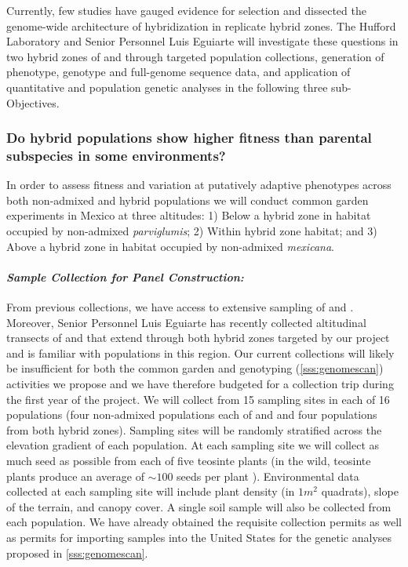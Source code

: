 Currently, few studies have gauged evidence for selection and dissected the genome-wide architecture of hybridization in replicate hybrid zones.
The Hufford Laboratory and Senior Personnel Luis Eguiarte  will investigate these questions in two hybrid zones of \zm{} and \zp{} through targeted population collections, generation of phenotype, genotype and full-genome sequence data, and application of quantitative and population genetic analyses in the following three sub-Objectives.

\subsubsection{Do hybrid populations show higher fitness than parental subspecies in some environments?} 
\label{sss:fitness}

In order to assess fitness and variation at putatively adaptive phenotypes across both non-admixed and  hybrid populations we will conduct common garden experiments in Mexico at three altitudes: 1) Below a hybrid zone in habitat occupied by non-admixed \emph{parviglumis}; 2) Within hybrid zone habitat; and 3) Above a hybrid zone in habitat occupied by non-admixed \emph{mexicana}. 

\paragraph{\emph{Sample Collection for Panel Construction:}}
From previous collections, we have access to extensive sampling of \zm{} and \zp{}.
Moreover, Senior Personnel Luis Eguiarte has recently collected altitudinal transects of \zp{} and \zm{} that extend through both hybrid zones targeted by our project \citep{Diez2013} and is familiar with populations in this region.
Our current collections will likely be insufficient for both the common garden and genotyping (\ref{sss:genomescan}) activities we propose and we have therefore budgeted for a collection trip during the first year of the project.
We will collect from 15 sampling sites in each of 16 populations (four non-admixed populations each of \zp{} and \zm{} and four populations from both hybrid zones).
Sampling sites will be randomly stratified across the elevation gradient of each population.
At each sampling site we will collect as much seed as possible from each of five teosinte plants (in the wild, teosinte plants produce an average of $\sim{100}$ seeds per plant \citep{wilkes1967teosinte}). 
Environmental data collected at each sampling site will include plant density (in $1 m^2$ quadrats), slope of the terrain, and canopy cover.
A single soil sample will also be collected from each population.  
We have already obtained the requisite collection permits as well as permits for importing samples into the United States for the genetic analyses proposed in \ref{sss:genomescan}.

